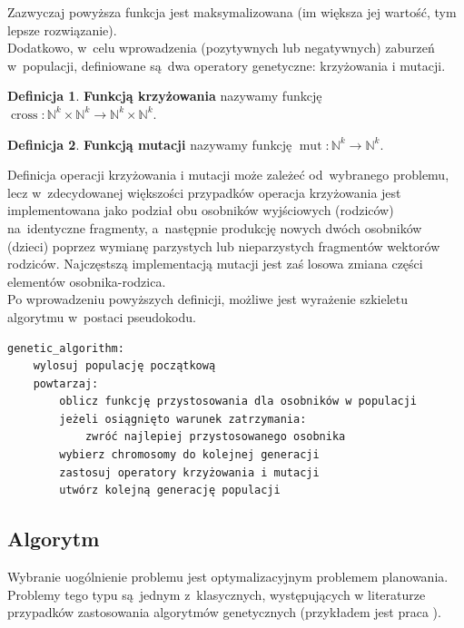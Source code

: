 \documentclass[12pt,a4paper]{article}
\theoremstyle{definition}
\newtheorem{defn}{Definicja}
\DeclareMathOperator{\cross}{cross}
\DeclareMathOperator{\mut}{mut}
\begin{document}
\noindent
Zazwyczaj powyższa funkcja jest maksymalizowana (im większa jej wartość, tym lepsze rozwiązanie).\\

\noindent
Dodatkowo, w~celu wprowadzenia (pozytywnych lub negatywnych) zaburzeń w~populacji, definiowane są~dwa operatory genetyczne: krzyżowania i mutacji.
\begin{defn}
\textbf{Funkcją krzyżowania} nazywamy funkcję $ \cross : \mathbb{N}^k \times \mathbb{N}^k \to \mathbb{N}^k \times \mathbb{N}^k $.
\end{defn}
\begin{defn}
\textbf{Funkcją mutacji} nazywamy funkcję $ \mut : \mathbb{N}^k \to \mathbb{N}^k $.
\end{defn}
\noindent
Definicja operacji krzyżowania i mutacji może zależeć od~wybranego problemu, lecz w~zdecydowanej większości przypadków operacja krzyżowania jest implementowana jako podział obu osobników wyjściowych (rodziców) na~identyczne fragmenty, a~następnie produkcję nowych dwóch osobników (dzieci) poprzez wymianę parzystych lub nieparzystych fragmentów wektorów rodziców.
Najczęstszą implementacją mutacji jest zaś losowa zmiana części elementów osobnika-rodzica.\\

\noindent
Po wprowadzeniu powyższych definicji, możliwe jest wyrażenie szkieletu algorytmu w~postaci pseudokodu.\\
\begin{tcolorbox}[title=Schemat algorytmu genetycznego]
\begin{verbatim}
genetic_algorithm:
    wylosuj populację początkową
    powtarzaj:
        oblicz funkcję przystosowania dla osobników w populacji
        jeżeli osiągnięto warunek zatrzymania:
            zwróć najlepiej przystosowanego osobnika
        wybierz chromosomy do kolejnej generacji
        zastosuj operatory krzyżowania i mutacji
        utwórz kolejną generację populacji
\end{verbatim}
\end{tcolorbox}

\subsection{Algorytm}
Wybranie uogólnienie problemu jest optymalizacyjnym problemem planowania. Problemy tego typu są~jednym z~klasycznych, występujących w literaturze przypadków zastosowania algorytmów genetycznych (przykładem jest praca \cite{wall1996}).\\
\end{document}
